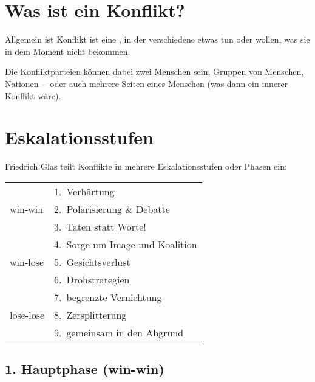 \section{Was ist ein Konflikt?}
\label{konflikt-definition}

Allgemein ist Konflikt ist eine , in der verschiedene  etwas  tun oder wollen, was sie in dem Moment nicht  bekommen.

Die Konfliktparteien können dabei zwei Menschen sein, Gruppen von Menschen, Nationen~-- oder auch mehrere Seiten eines Menschen (was dann ein innerer Konflikt wäre).

\section{Eskalationsstufen}
\label{eskalationsstufen}

Friedrich Glas \cite{glasl-konfliktmanegement} teilt Konflikte in mehrere Eskalationsstufen oder Phasen ein:

\vspace{1em}

\begin{tabular}{ l l }
 \multirow{3}{5em}{win-win}   & 1.~Verhärtung \\
                              & 2.~Polarisierung \& Debatte \\
                              & 3.~Taten statt Worte! \\ \hline
 \multirow{3}{5em}{win-lose}  & 4.~Sorge um Image und Koalition \\
                              & 5.~Gesichtsverlust \\
                              & 6.~Drohstrategien \\ \hline
 \multirow{3}{5em}{lose-lose} & 7.~begrenzte Vernichtung \\
                              & 8.~Zersplitterung \\
                              & 9.~gemeinsam in den Abgrund \\
\end{tabular}


\subsection{1. Hauptphase (win-win)}

